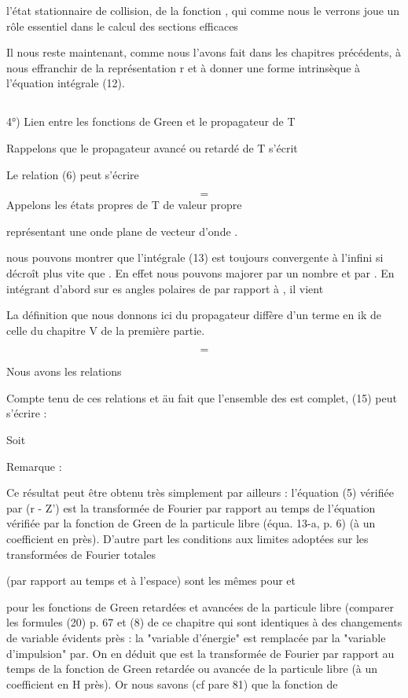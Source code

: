 
l'état stationnaire de collision, de la fonction , qui comme
nous le verrons joue un rôle essentiel dans le calcul des sections efficaces

Il nous reste maintenant, comme nous l'avons fait dans les
chapitres précédents, à nous effranchir de la représentation r et à donner une forme
intrinsèque à l'équation intégrale (12).

\subsection{}%
4°) Lien entre les fonctions de Green  et le
propagateur de T

Rappelons que le propagateur avancé ou retardé de T s'écrit

Le relation (6) peut s'écrire

\[
\tag{15}=
\]
Appelons  les états propres de T de valeur propre

 représentant une onde plane de vecteur d'onde .

nous pouvons montrer que l'intégrale (13) est toujours convergente à
l'infini si  décroît plus vite que . En effet nous pouvons majorer
 par un nombre  et  par .
En intégrant d'abord sur es angles polaires de  par rapport
à , il vient

La définition que nous donnons ici du propagateur diffère d'un terme
en ik de celle du chapitre V de la première partie.

\[
\tag{16}=
\]


Nous avons les relations

Compte tenu de ces relations et äu fait que l'ensemble des  est
complet, (15) peut s'écrire :

Soit

Remarque :

Ce résultat peut être obtenu très simplement par ailleurs : l'équation
(5) vérifiée par (r - Z') est la transformée de Fourier par rapport
au temps de l'équation vérifiée par la fonction de Green de la particule
libre (équa. 13-a, p. 6) (à un coefficient en  près). D'autre part les
conditions aux limites adoptées sur les transformées de Fourier totales

(par rapport au temps et à l'espace) sont les mêmes pour  et

pour les fonctions de Green retardées et avancées de la particule libre
(comparer les formules (20) p. 67 et (8) de ce chapitre qui sont identiques à des
changements de variable évidents près : la "variable d'énergie"
 est remplacée par  la "variable d'impulsion"  par. On en déduit que  est la transformée
 de Fourier par rapport au temps
de la fonction de Green retardée ou avancée de la particule libre (à un
coefficient en H près). Or nous savons (cf pare 81) que la fonction de

